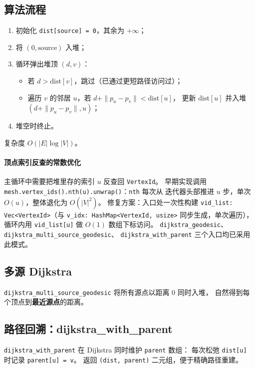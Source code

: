 \documentclass[11pt,a4paper]{article}
\begin{document}
\subsection{算法流程}

\begin{enumerate}
  \item 初始化 \texttt{dist[source] = 0}，其余为 $+\infty$；
  \item 将 $(0, \text{source})$ 入堆；
  \item 循环弹出堆顶 $(d, v)$：
    \begin{itemize}
      \item 若 $d > \text{dist}[v]$，跳过（已通过更短路径访问过）；
      \item 遍历 $v$ 的邻居 $u$，若 $d + \|p_u - p_v\| < \text{dist}[u]$，
            更新 $\text{dist}[u]$ 并入堆 $(d + \|p_u - p_v\|, u)$；
    \end{itemize}
  \item 堆空时终止。
\end{enumerate}

复杂度 $O(|E|\log|V|)$。

\paragraph{顶点索引反查的常数优化}
主循环中需要把堆里存的索引 $u$ 反查回 \texttt{VertexId}。
早期实现调用 \texttt{mesh.vertex\_ids().nth(u).unwrap()}：\texttt{nth} 每次从
迭代器头部推进 $u$ 步，单次 $O(u)$，整体退化为 $O(|V|^2)$。
修复方案：入口处一次性构建 \texttt{vid\_list: Vec<VertexId>}（与
\texttt{v\_idx: HashMap<VertexId, usize>} 同步生成，单次遍历），
循环内用 \texttt{vid\_list[u]} 做 $O(1)$ 数组下标访问。
\texttt{dijkstra\_geodesic}、\texttt{dijkstra\_multi\_source\_geodesic}、
\texttt{dijkstra\_with\_parent} 三个入口均已采用此模式。

\subsection{多源 Dijkstra}

\texttt{dijkstra\_multi\_source\_geodesic} 将所有源点以距离 $0$ 同时入堆，
自然得到每个顶点到\textbf{最近源点}的距离。

\subsection{路径回溯：dijkstra\_with\_parent}

\texttt{dijkstra\_with\_parent} 在 Dijkstra 同时维护 \texttt{parent} 数组：
每次松弛 \texttt{dist[u]} 时记录 \texttt{parent[u] = v}。
返回 \texttt{(dist, parent)} 二元组，便于精确路径重建。
\end{document}
